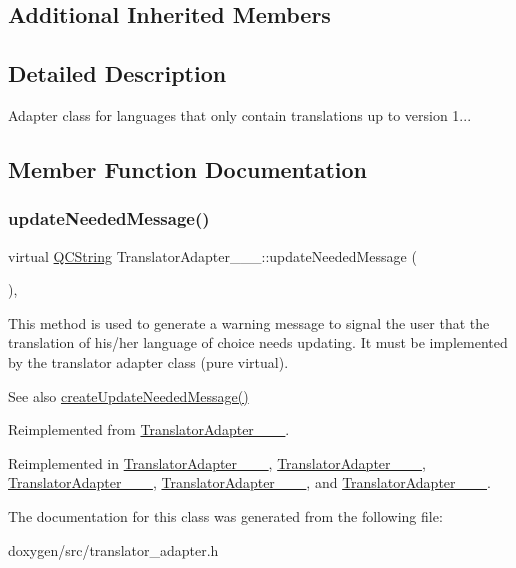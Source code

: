 \subsection*{Additional Inherited Members}


\subsection{Detailed Description}
Adapter class for languages that only contain translations up to version 1... 

\subsection{Member Function Documentation}
\mbox{\label{class_translator_adapter__1__8__0_a47cedb130d9a178d9c632584d4f2abec}} 
\subsubsection{\texorpdfstring{updateNeededMessage()}{updateNeededMessage()}}
{\footnotesize\ttfamily virtual \mbox{\hyperlink{class_q_c_string}{Q\+C\+String}} Translator\+Adapter\+\_\+\_\+\_\+::update\+Needed\+Message (\begin{DoxyParamCaption}{ }\end{DoxyParamCaption})\hspace{0.3cm}{\ttfamily [inline]}, {\ttfamily [virtual]}}

This method is used to generate a warning message to signal the user that the translation of his/her language of choice needs updating. It must be implemented by the translator adapter class (pure virtual).

\begin{DoxySeeAlso}{See also}
\mbox{\hyperlink{class_translator_adapter_base_a71493b87a34d6e4c232e540734aba698}{create\+Update\+Needed\+Message()}} 
\end{DoxySeeAlso}


Reimplemented from \mbox{\hyperlink{class_translator_adapter__1__8__2_a307747456f69ab8dcb0c2be27f429e80}{Translator\+Adapter\+\_\+\_\+\_}}.



Reimplemented in \mbox{\hyperlink{class_translator_adapter__1__4__6_ab19b01d4e00c95ef1e6eb631fbe6ada4}{Translator\+Adapter\+\_\+\_\+\_}}, \mbox{\hyperlink{class_translator_adapter__1__5__4_a587a31dad925e47f206b6a0cda9eedd0}{Translator\+Adapter\+\_\+\_\+\_}}, \mbox{\hyperlink{class_translator_adapter__1__6__0_abc231eb2c1864ca9f878e7e5deb94f54}{Translator\+Adapter\+\_\+\_\+\_}}, \mbox{\hyperlink{class_translator_adapter__1__6__3_ab3d79abfb926c41bd7609eeb706654fe}{Translator\+Adapter\+\_\+\_\+\_}}, and \mbox{\hyperlink{class_translator_adapter__1__7__5_a6e69d48e79a13c9d934f9af1a8befd8a}{Translator\+Adapter\+\_\+\_\+\_}}.



The documentation for this class was generated from the following file\+:\begin{DoxyCompactItemize}
\item 
doxygen/src/translator\+\_\+adapter.\+h\end{DoxyCompactItemize}

